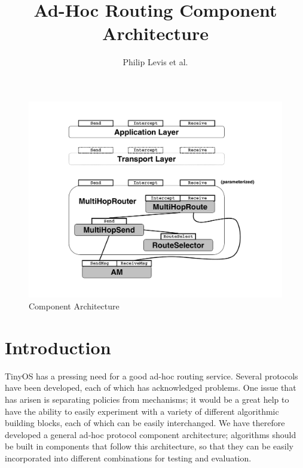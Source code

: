 \documentclass[10pt]{article}
\begin{document}
\fontsize{10}{10}                               %

\title{Ad-Hoc Routing Component Architecture}
\author{Philip Levis et al.}
\maketitle

\fontsize{10}{10}                               %


\begin{figure}
\centering
\includegraphics[angle=-90,scale=.25]{fig/arch.pdf}
\caption{Component Architecture}
\label{fig:arch}
\end{figure}


\section*{Introduction}

TinyOS has a pressing need for a good ad-hoc routing service. Several
protocols have been developed, each of which has acknowledged
problems. One issue that has arisen is separating policies from
mechanisms; it would be a great help to have the ability to easily
experiment with a variety of different algorithmic building blocks,
each of which can be easily interchanged. We have therefore developed
a general ad-hoc protocol component architecture; algorithms should be
built in components that follow this architecture, so that they can be
easily incorporated into different combinations for testing and
evaluation.
\end{document}
